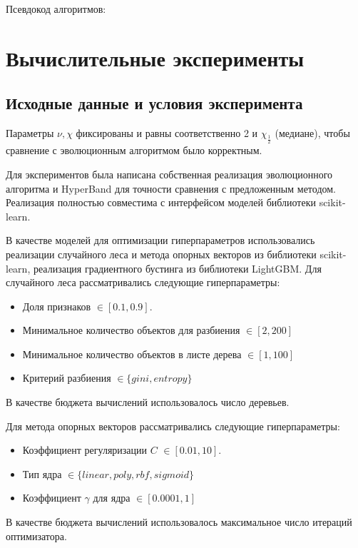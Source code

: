 \documentclass[a4paper,12pt]{article}
\begin{document}
Псевдокод алгоритмов:

\section{Вычислительные эксперименты}

\subsection{Исходные данные и условия эксперимента}
Параметры $\nu, \chi$ фиксированы и равны соответственно 2 и $\chi_{\frac{1}{2}}$ (медиане), чтобы сравнение с эволюционным алгоритмом было корректным.

Для экспериментов была написана собственная реализация эволюционного алгоритма и HyperBand для точности сравнения с предложенным методом. Реализация полностью совместима с интерфейсом моделей библиотеки scikit-learn.

В качестве моделей для оптимизации гиперпараметров использовались реализации случайного леса и метода опорных векторов из библиотеки scikit-learn, реализация градиентного бустинга из библиотеки LightGBM.
Для случайного леса рассматривались следующие гиперпараметры:
\begin{itemize}
    \item Доля признаков $\in [0.1, 0.9].$
    \item Минимальное количество объектов для разбиения $\in [2, 200]$
    \item Минимальное количество объектов в листе дерева $\in [1, 100]$
    \item Критерий разбиения $\in \{gini, entropy\}$
\end{itemize}
В качестве бюджета вычислений использовалось число деревьев.

Для метода опорных векторов рассматривались следующие гиперпараметры:
\begin{itemize}
    \item Коэффициент регуляризации $C$ $\in [0.01, 10].$
    \item Тип ядра $\in \{linear, poly, rbf, sigmoid\}$
    \item Коэффициент $\gamma$ для ядра $\in [0.0001, 1]$
\end{itemize}
В качестве бюджета вычислений использовалось максимальное число итераций оптимизатора.
\end{document}
